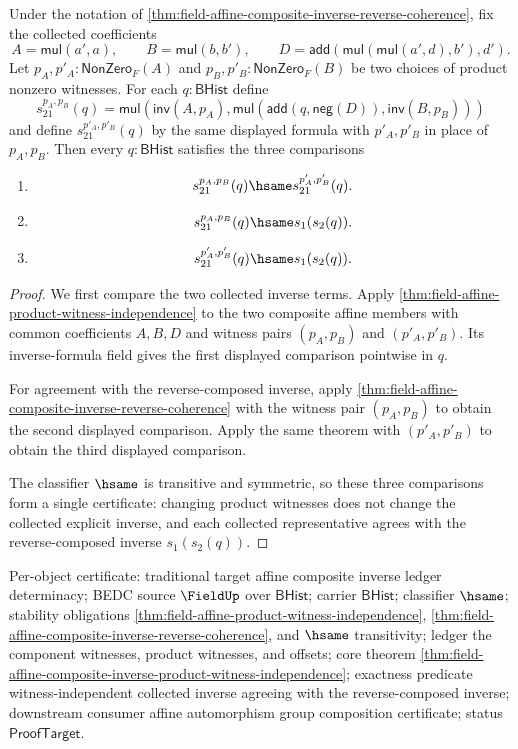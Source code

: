 \begin{theorem}
\label{thm:field-affine-composite-inverse-product-witness-independence}
Under the notation of
\autoref{thm:field-affine-composite-inverse-reverse-coherence}, fix the
collected coefficients
$$
A=\mathsf{mul}(a',a),
\qquad
B=\mathsf{mul}(b,b'),
\qquad
D=\mathsf{add}(\mathsf{mul}(\mathsf{mul}(a',d),b'),d').
$$
Let $p_A,p'_A:\mathsf{NonZero}_F(A)$ and
$p_B,p'_B:\mathsf{NonZero}_F(B)$ be two choices of product nonzero witnesses.
For each $q:\mathsf{BHist}$ define
$$
s_{21}^{p_A,p_B}(q)=
\mathsf{mul}(\mathsf{inv}(A,p_A),
\mathsf{mul}(\mathsf{add}(q,\mathsf{neg}(D)),\mathsf{inv}(B,p_B)))
$$
and define $s_{21}^{p'_A,p'_B}(q)$ by the same displayed formula with
$p'_A,p'_B$ in place of $p_A,p_B$. Then every $q:\mathsf{BHist}$ satisfies
the three comparisons
\begin{enumerate}
\item

$$
s_{21}^{p_A,p_B}(q)\hsame s_{21}^{p'_A,p'_B}(q).
$$
\item

$$
s_{21}^{p_A,p_B}(q)\hsame s_1(s_2(q)).
$$
\item

$$
s_{21}^{p'_A,p'_B}(q)\hsame s_1(s_2(q)).
$$
\end{enumerate}
\end{theorem}
\begin{proof}
We first compare the two collected inverse terms. Apply
\autoref{thm:field-affine-product-witness-independence} to the two composite
affine members with common coefficients $A,B,D$ and witness pairs
$(p_A,p_B)$ and $(p'_A,p'_B)$. Its inverse-formula field gives the first
displayed comparison pointwise in $q$.

For agreement with the reverse-composed inverse, apply
\autoref{thm:field-affine-composite-inverse-reverse-coherence} with the
witness pair $(p_A,p_B)$ to obtain the second displayed comparison. Apply the
same theorem with $(p'_A,p'_B)$ to obtain the third displayed comparison.

The classifier $\hsame$ is transitive and symmetric, so these three
comparisons form a single certificate: changing product witnesses does not
change the collected explicit inverse, and each collected representative
agrees with the reverse-composed inverse $s_1(s_2(q))$.
\end{proof}

Per-object certificate: traditional target affine composite inverse ledger
determinacy; BEDC source $\FieldUp$ over $\mathsf{BHist}$; carrier
$\mathsf{BHist}$; classifier $\hsame$; stability obligations
\autoref{thm:field-affine-product-witness-independence},
\autoref{thm:field-affine-composite-inverse-reverse-coherence}, and $\hsame$
transitivity; ledger the component witnesses, product witnesses, and offsets;
core theorem
\autoref{thm:field-affine-composite-inverse-product-witness-independence};
exactness predicate witness-independent collected inverse agreeing with the
reverse-composed inverse; downstream consumer affine automorphism group
composition certificate; status $\mathsf{ProofTarget}$.
